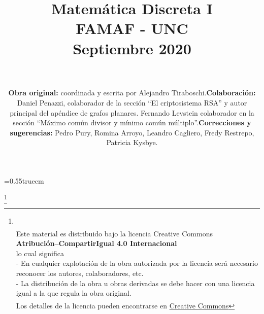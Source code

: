 \documentclass[a4paper,12pt,twoside,spanish,reqno]{amsbook}
\numberwithin{equation}{section}
\theoremstyle{definition}
\theoremstyle{remark}
\begin{document}
\baselineskip=0.55truecm %





\title{Matemática Discreta I \\ FAMAF  - UNC \\ Septiembre 2020 }

\maketitle



\author{
${}^{}$
\\${}^{}$
\\${}^{}$
 \\${}^{}$\\ 
\flushleft 
\begin{itemize}
\item \textbf{Obra original:} coordinada y escrita por Alejandro Tiraboschi. 
\item \textbf{Colaboración: } Daniel Penazzi, colaborador  de la sección ``El criptosistema RSA'' y autor principal del apéndice de grafos planares. Fernando Levstein colaborador en la sección ``Máximo común divisor y mínimo común múltiplo''.   
\item \textbf{Correcciones y sugerencias:} Pedro Pury, Romina Arroyo, Leandro Cagliero, Fredy Restrepo, Patricia Kysbye. 
\end{itemize}
}









\vskip 2cm 
\thanks{
 \\
${}^{}$\\
{\flushleft 
Este material es distribuido bajo la licencia Creative Commons} \\
{\center \textbf{Atribución--CompartirIgual 4.0 Internacional}}
\\ 
\center  lo cual significa 
\\
\flushleft
 - En cualquier explotación de la obra autorizada por la licencia será necesario reconocer los autores, colaboradores, etc.\\
 - La distribución de la obra u obras derivadas se debe hacer con una licencia igual a la que regula la obra original.\\
${}^{}$
\\
Los detalles de la licencia pueden encontrarse en \href{https://creativecommons.org/licenses/by/4.0/deed.es}{Creative Commons}
}
\end{document}
